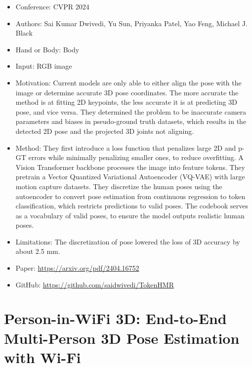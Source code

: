\documentclass{article}
\begin{document}
\begin{itemize}
    \item Conference: CVPR 2024
    \item Authors: Sai Kumar Dwivedi, Yu Sun, Priyanka Patel, Yao Feng, Michael J. Black
    \item Hand or Body: Body
    \item Input: RGB image
    \item Motivation: Current models are only able to either align the pose with the image or determine accurate 3D pose coordinates. The more accurate the method is at fitting 2D keypoints, the less accurate it is at predicting 3D pose, and vice versa. They determined the problem to be inaccurate camera parameters and biases in pseudo-ground truth datasets, which results in the detected 2D pose and the projected 3D joints not aligning.
    \item Method: They first introduce a loss function that penalizes large 2D and p-GT errors while minimally penalizing smaller ones, to reduce overfitting. A Vision Transformer backbone processes the image into feature tokens. They pretrain a Vector Quantized Variational Autoencoder (VQ-VAE) with large motion capture datasets. They discretize the human poses using the autoencoder to convert pose estimation from continuous regression to token classification, which restricts predictions to valid poses. The codebook serves as a vocabulary of valid poses, to ensure the model outputs realistic human poses.
    \item Limitations: The discretization of pose lowered the loss of 3D accuracy by about 2.5 mm.
    \item Paper: \url{https://arxiv.org/pdf/2404.16752}
    \item GitHub: \url{https://github.com/saidwivedi/TokenHMR}
\end{itemize}

\section*{Person-in-WiFi 3D: End-to-End Multi-Person 3D Pose Estimation with Wi-Fi}
\end{document}
